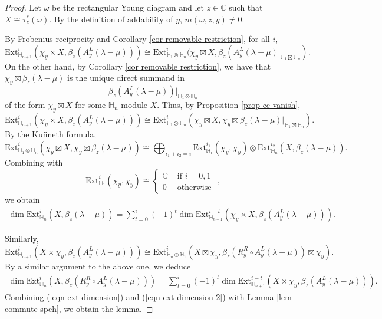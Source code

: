 \documentclass[11pt]{amsart}
\numberwithin{equation}{section}
\theoremstyle{definition}
\begin{document}
\begin{proof}
Let $\omega$ be the rectangular Young diagram and let $z \in \mathbb C$ such that $X\cong \tau_z^*(\omega)$. By the definition of addability of $y$, $m(\omega, z, y)\neq 0$. 


By Frobenius reciprocity and Corollary \ref{cor removable restriction}, for all $i$,
\[  \mathrm{Ext}^i_{\mathbb H_{n+1}}(\chi_y \times X, \beta_z(A^L_y(\lambda-\mu))) \cong  \mathrm{Ext}^i_{\mathbb H_{1}\otimes \mathbb H_{n}}(\chi_y \boxtimes X, \beta_z(A^L_y(\lambda-\mu)|_{\mathbb H_{1}\boxtimes \mathbb H_n}) . \]
On the other hand, by Corollary \ref{cor removable restriction}, we have that $\chi_y\boxtimes \beta_z(\lambda-\mu)$ is the unique direct summand in
\[  \beta_z(A_y^L(\lambda-\mu))|_{\mathbb H_1\otimes \mathbb H_{n}}
\]
of the form $\chi_y \boxtimes X$ for some $\mathbb H_{n}$-module $X$. Thus, by Proposition \ref{prop cc vanish},
\[  \mathrm{Ext}^i_{\mathbb H_{n+1}}( \chi_y \times X, \beta_z(A^L_y(\lambda-\mu))) \cong \mathrm{Ext}^i_{\mathbb H_1 \otimes \mathbb H_{n}}(\chi_y\boxtimes X, \chi_y\boxtimes \beta_z(\lambda-\mu)|_{\mathbb{H}_1\boxtimes\mathbb{H}_n}) .
\]
By the Ku\"nneth formula,
\[  \mathrm{Ext}^i_{\mathbb H_1\otimes \mathbb H_n}(\chi_y \boxtimes X, \chi_y\boxtimes\beta_z(\lambda-\mu))\cong \bigoplus_{i_1+i_2=i} \mathrm{Ext}^{i_1}_{\mathbb H_1}(\chi_y, \chi_y)\otimes\mathrm{Ext}^{i_2}_{\mathbb H_{n}}(X, \beta_z(\lambda-\mu))  .
\]
Combining with 
\[ \mathrm{Ext}^i_{\mathbb H_1}(\chi_y, \chi_y)\cong \begin{cases} \mathbb C & \mbox{ if \(i=0,1\)} \\ 0 & \mbox{ otherwise } \end{cases} ,
\]
we obtain
\begin{align} \label{eqn ext dimension}
\dim \mathrm{Ext}^{i}_{\mathbb H_{n}}(X, \beta_z(\lambda-\mu))=\sum_{t=0}^{i}(-1)^{t}\dim \mathrm{Ext}^{i-t}_{\mathbb H_{n+1}}(\chi_y \times X,  \beta_z(A^L_y(\lambda-\mu))).
\end{align}



Similarly, 
\[  \mathrm{Ext}^i_{\mathbb H_{n+1}}(X\times \chi_y, \beta_z(A^L_y(\lambda-\mu))) \cong \mathrm{Ext}^i_{\mathbb H_{n} \otimes \mathbb H_1}( X \boxtimes \chi_y,  \beta_z(R^R_y\circ A^L_y(\lambda-\mu))\boxtimes \chi_y ) .
\]
By a similar argument to the above one, we deduce 
\begin{align} \label{eqn ext dimension 2}
\dim \mathrm{Ext}^i_{\mathbb H_n}(X, \beta_z(R^R_y\circ A^L_y(\lambda-\mu))) =\sum_{t=0}^{i}(-1)^{t}\dim \mathrm{Ext}^{i-t}_{\mathbb H_{n+1}}( X \times \chi_y,  \beta_z(A^L_y(\lambda-\mu))). 
\end{align}
Combining (\ref{eqn ext dimension}) and (\ref{eqn ext dimension 2}) with Lemma \ref{lem commute speh}, we obtain the lemma.
\end{proof}
\end{document}
